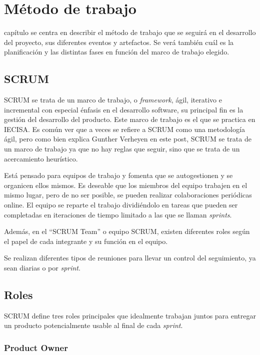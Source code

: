 \chapter{Método de trabajo}
\label{chap:metodo}

 capítulo se centra en describir el método de trabajo que se seguirá en el desarrollo del proyecto, sus diferentes eventos y artefactos. Se verá también cuál es la planificación y las distintas fases en función del marco de trabajo elegido.

\section{SCRUM}
\label{scrum}

SCRUM  se trata de un marco de trabajo, o \emph{framework}, ágil,  iterativo e incremental con especial énfasis en el desarrollo software, su principal fin es la gestión del desarrollo del producto. Este marco de trabajo es el que se practica en IECISA. Es común ver que a veces se refiere a SCRUM como una metodología ágil, pero como bien explica Gunther Verheyen en este post\cite{notMethodology}, SCRUM se trata de un marco de trabajo ya que no hay reglas que seguir, sino que se trata de un acercamiento heurístico.

Está pensado para equipos de trabajo y fomenta que se autogestionen y se organicen ellos mismos. Es deseable que los miembros del equipo trabajen en el mismo lugar, pero de no ser posible, se pueden realizar colaboraciones periódicas online. El equipo se reparte el trabajo dividiéndolo en tareas que pueden ser completadas en iteraciones de tiempo limitado a las que se llaman \emph{sprints}.

Además, en el ``SCRUM Team'' o equipo SCRUM, existen diferentes roles según el papel de cada integrante y su función en el equipo.

Se realizan diferentes tipos de reuniones para llevar un control del seguimiento, ya sean diarias o por \emph{sprint}.


\section{Roles}
\label{roles}

SCRUM define tres roles principales que idealmente trabajan juntos para entregar un producto potencialmente usable al final de cada \emph{sprint}.

\subsection{Product Owner}
\label{ProductOwner}

